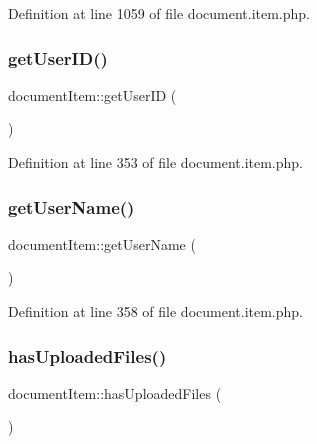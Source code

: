 Definition at line 1059 of file document.\+item.\+php.

\hypertarget{classdocumentItem_a66a8157a3cc7c82325eadcefe6390a58}{}\label{classdocumentItem_a66a8157a3cc7c82325eadcefe6390a58} 
\subsubsection{\texorpdfstring{get\+User\+I\+D()}{getUserID()}}
{\footnotesize\ttfamily document\+Item\+::get\+User\+ID (\begin{DoxyParamCaption}{ }\end{DoxyParamCaption})}



Definition at line 353 of file document.\+item.\+php.

\hypertarget{classdocumentItem_a072696b683278c84bc3ebfee46d4216f}{}\label{classdocumentItem_a072696b683278c84bc3ebfee46d4216f} 
\subsubsection{\texorpdfstring{get\+User\+Name()}{getUserName()}}
{\footnotesize\ttfamily document\+Item\+::get\+User\+Name (\begin{DoxyParamCaption}{ }\end{DoxyParamCaption})}



Definition at line 358 of file document.\+item.\+php.

\hypertarget{classdocumentItem_af031d09271c9099d26b6619f9c436f68}{}\label{classdocumentItem_af031d09271c9099d26b6619f9c436f68} 
\subsubsection{\texorpdfstring{has\+Uploaded\+Files()}{hasUploadedFiles()}}
{\footnotesize\ttfamily document\+Item\+::has\+Uploaded\+Files (\begin{DoxyParamCaption}{ }\end{DoxyParamCaption})}



